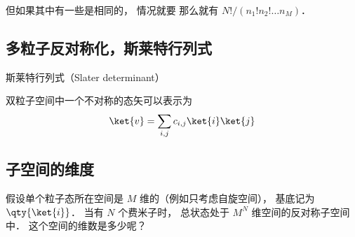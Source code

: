 但如果其中有一些是相同的， 情况就要 那么就有 $N!/(n_1! n_2! \dots n_M)$．

\subsection{多粒子反对称化，斯莱特行列式}



斯莱特行列式（Slater determinant）

双粒子空间中一个不对称的态矢可以表示为
\begin{equation}
\ket{v} = \sum_{i,j} c_{i,j} \ket{i}\ket{j}
\end{equation}

\subsection{子空间的维度}
假设单个粒子态所在空间是 $M$ 维的（例如只考虑自旋空间）， 基底记为 $\qty{\ket{i}}$． 当有 $N$ 个费米子时， 总状态处于 $M^N$ 维空间的反对称子空间中． 这个空间的维数是多少呢？  



